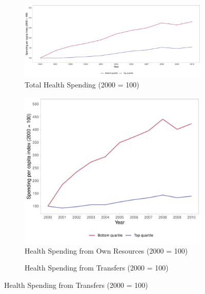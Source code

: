 \begin{figure}[h!]
    \begin{center}
    \caption{\footnotesize Health Spending Trends}\label{fig:2}
    \begin{subfigure}{.9\textwidth}
        \caption{\scriptsize Total Health Spending (2000 = 100)}\label{fig:2a}
        \centering
        \includegraphics[width=\textwidth]{plots/plot_total.pdf}
    \end{subfigure}
        \begin{subfigure}{0.45\textwidth}
        \caption{\scriptsize Health Spending from Own Resources (2000 = 100)}\label{fig:2b}
        \centering
        \includegraphics[width=\textwidth]{plots/plot_own.pdf}
    \end{subfigure}
        \begin{subfigure}{0.45\textwidth}
        \caption{\scriptsize Health Spending from Transfers (2000 = 100)}\label{fig:2c}
        \centering

\end{subfigure}
\end{center}
\end{figure}
